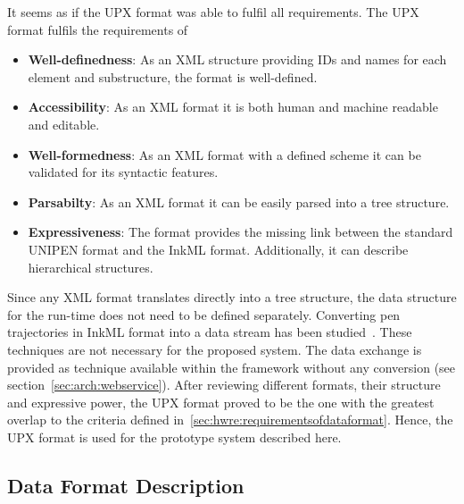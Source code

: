 It seems as if the UPX format was able to fulfil all requirements.
The UPX format fulfils the requirements of
\begin{itemize}
  \item \textbf{Well-definedness}: As an XML structure providing IDs and names 
        for each element and substructure, the format is well-defined.

  \item \textbf{Accessibility}: As an XML format it is both human and machine
        readable and editable.

  \item \textbf{Well-formedness}: As an XML format with a defined scheme it can
        be validated for its syntactic features.

  \item \textbf{Parsabilty}: As an XML format it can be easily parsed into a
        tree structure.

  \item \textbf{Expressiveness}: The format provides the missing link between the
        standard UNIPEN format and the InkML format. Additionally, it can 
        describe hierarchical structures.
\end{itemize}
Since any XML format translates directly into a tree structure, the data 
structure for the run-time does not need to be defined separately.
Converting pen trajectories in InkML format into a data stream has been 
studied~. These techniques are not necessary 
for the proposed system. The data exchange is provided as technique available
within the framework without any conversion (see 
section~\ref{sec:arch:webservice}).
After reviewing different formats, their structure and expressive power,
the UPX format proved to be the one with the greatest overlap to the
criteria defined in~\ref{sec:hwre:requirementsofdataformat}. Hence, the
UPX format is used for the prototype system described here.

\subsection{Data Format Description}
\label{sec:hwre:dataformatdescription}




